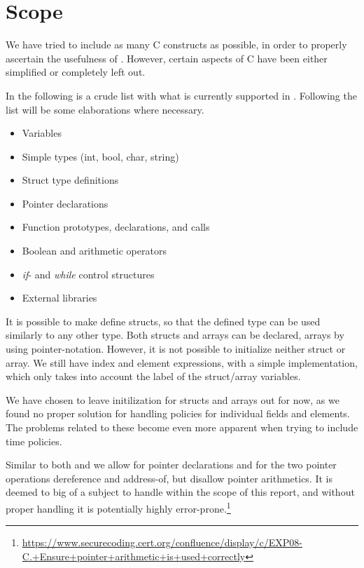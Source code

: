 
\section{Scope}
We have tried to include as many C constructs as possible, in order to properly ascertain the usefulness of \thelang.
However, certain aspects of C have been either simplified or completely left out.

In the following is a crude list with what is currently supported in \thelang.
Following the list will be some elaborations where necessary.
\begin{itemize}
  \item Variables
  \item Simple types (int, bool, char, string)
  \item Struct type definitions
  \item Pointer declarations
  \item Function prototypes, declarations, and calls
  \item Boolean and arithmetic operators
  \item \emph{if}- and \emph{while} control structures
  \item External libraries
\end{itemize}

It is possible to make define structs, so that the defined type can be used similarly to any other type.
Both structs and arrays can be declared, arrays by using pointer-notation.
However, it is not possible to initialize neither struct or array.
We still have index and element expressions, with a simple implementation, which only takes into account the label of the struct/array variables.

We have chosen to leave initilization for structs and arrays out for now, as we found no proper solution for handling policies for individual fields and elements.
The problems related to these become even more apparent when trying to include time policies.

Similar to both \cite{muller2015cif} and \cite{maciazek2016cbif} we allow for pointer declarations and for the two pointer operations dereference and address-of, but disallow pointer arithmetics.
It is deemed to big of a subject to handle within the scope of this report, and without proper handling it is potentially highly error-prone.\footnote{\url{https://www.securecoding.cert.org/confluence/display/c/EXP08-C.+Ensure+pointer+arithmetic+is+used+correctly}}

